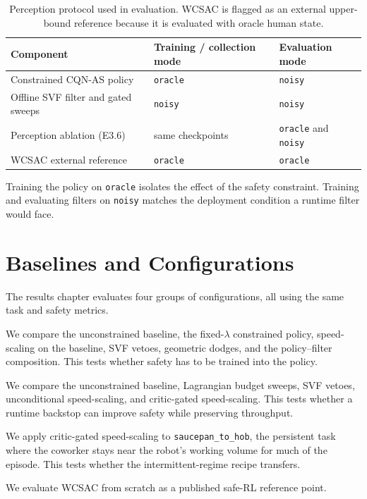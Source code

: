 \documentclass[11pt,a4paper]{report}
\newcommand{\cqnas}{CQN-AS}
\begin{document}
\begin{table}[htbp]
\centering
\small
\caption{Perception protocol used in evaluation. WCSAC is flagged as
an external upper-bound reference because it is evaluated with oracle
human state.}
\label{tab:perception-protocol}
\begin{tabular}{lll}
\toprule
Component & Training / collection mode & Evaluation mode \\
\midrule
Constrained \cqnas{} policy & \texttt{oracle} & \texttt{noisy} \\
Offline SVF filter and gated sweeps & \texttt{noisy} & \texttt{noisy} \\
Perception ablation (E3.6) & same checkpoints & \texttt{oracle} and \texttt{noisy} \\
WCSAC external reference & \texttt{oracle} & \texttt{oracle} \\
\bottomrule
\end{tabular}
\end{table}

Training the policy on \texttt{oracle} isolates the effect of the
safety constraint. Training and evaluating filters on \texttt{noisy}
matches the deployment condition a runtime filter would face.

\section{Baselines and Configurations}
\label{sec:setup:baselines}

The results chapter evaluates four groups of configurations, all using
the same task and safety metrics.

\begin{description}[leftmargin=2em,style=nextline,itemsep=2pt]
\item[Persistent co-location: \texttt{saucepan\_to\_hob}.]
We compare the unconstrained baseline, the fixed-$\lambda$ constrained
policy, speed-scaling on the baseline, SVF vetoes, geometric dodges,
and the policy--filter composition. This tests whether safety has to
be trained into the policy.
\item[Intermittent co-location: \texttt{dishwasher\_close} and
\texttt{drawers\_open\_all}.]
We compare the unconstrained baseline, Lagrangian budget sweeps, SVF
vetoes, unconditional speed-scaling, and critic-gated speed-scaling.
This tests whether a runtime backstop can improve safety while
preserving throughput.
\item[Boundary test.]
We apply critic-gated speed-scaling to \texttt{saucepan\_to\_hob}, the
persistent task where the coworker stays near the robot's working
volume for much of the episode. This tests whether the
intermittent-regime recipe transfers.
\item[External reference.]
We evaluate WCSAC from scratch as a published safe-RL reference point.
\end{description}
\end{document}
